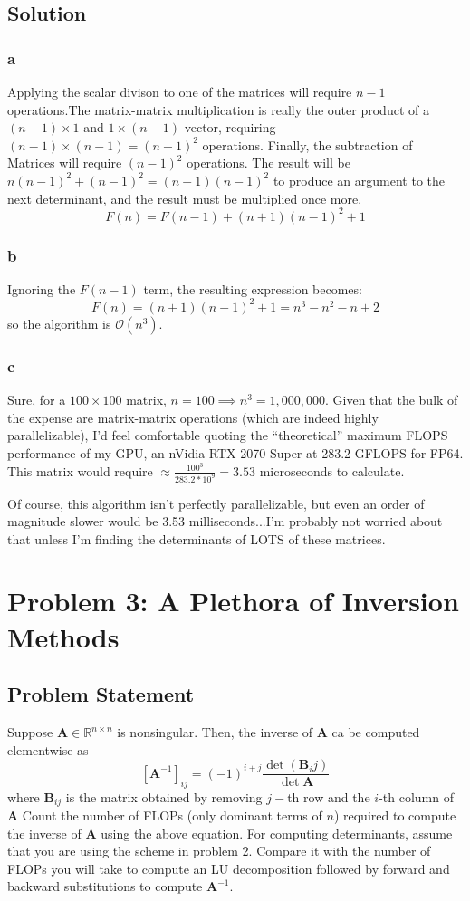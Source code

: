 \documentclass[11pt]{report}
\theoremstyle{definition}
\newcommand{\mat}[1]{\mathbf{#1}}
\begin{document}
\subsection*{Solution}
\subsubsection*{a}
Applying the scalar divison to one of the matrices will require $n-1$
operations.The matrix-matrix multiplication is really the outer product of a
$(n-1)\times 1$ and $1\times(n-1)$ vector, requiring $(n-1)\times(n-1)=(n-1)^2$
operations. Finally, the subtraction of Matrices will require $(n-1)^2$ operations.
The result will be $n(n-1)^2+(n-1)^2=(n+1)(n-1)^2$ to produce an argument to the
next determinant, and the result must be multiplied once more.
\[ F(n) = F(n-1) + (n+1)(n-1)^2 + 1 \]

\subsubsection*{b}
Ignoring the $F(n-1)$ term, the resulting expression becomes:
\[F(n) = (n+1)(n-1)^2+1 = n^3-n^2-n+2\]
so the algorithm is $\mathcal{O}(n^3)$.

\subsubsection*{c}
Sure, for a $100\times100$ matrix, $n=100\implies n^3=1,000,000$. Given that
the bulk of the expense are matrix-matrix operations (which are indeed highly
parallelizable), I'd feel comfortable quoting the ``theoretical'' maximum FLOPS
performance of my GPU, an nVidia RTX 2070 Super at 283.2 GFLOPS for FP64.
This matrix would require $\approx \frac{100^3}{283.2*10^9}=3.53$ microseconds
to calculate.

Of course, this algorithm isn't perfectly parallelizable, but even an order of
magnitude slower would be 3.53 milliseconds...I'm probably not worried about
that unless I'm finding the determinants of LOTS of these matrices.

\newpage
\section*{Problem 3: A Plethora of Inversion Methods}
\subsection*{Problem Statement}
Suppose $\mat{A}\in\mathbb{R}^{n\times n}$ is nonsingular. Then, the inverse of
$\mat{A}$ ca be computed elementwise as
\[ \left[\mat{A}^{-1}\right]_{ij} = (-1)^{i+j}\frac{\det(\mat{B}_ij)}{\det{\mat{A}}} \]
where $\mat{B}_{ij}$ is the matrix obtained by removing $j-$th row and the
$i$-th column of $\mat{A}$ Count the number of FLOPs (only dominant terms of
$n$) required to compute the inverse of $\mat{A}$ using the above equation. For
computing determinants, assume that you are using the scheme in problem 2.
Compare it with the number of FLOPs you will take to compute an LU decomposition
followed by forward and backward substitutions to compute $\mat{A}^{-1}$.
\end{document}
